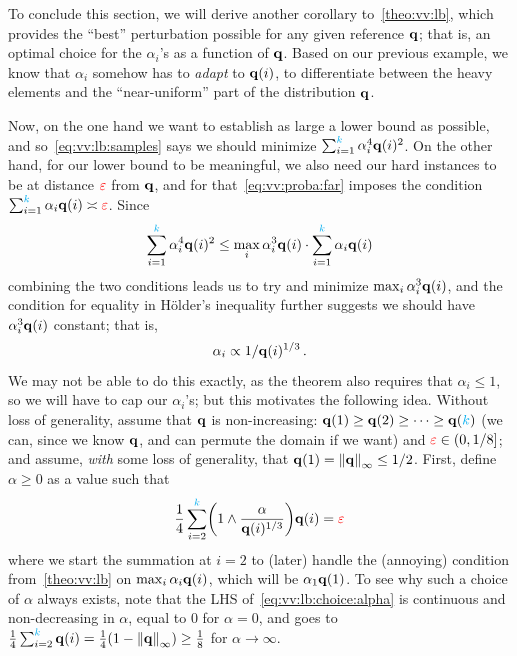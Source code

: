 To conclude this section, we will derive another corollary to~\cref{theo:vv:lb}, which provides the ``best'' perturbation possible for any given reference $\mathbf{q}$; that is, an optimal choice for the $\alpha_i$'s as a function of $\mathbf{q}$. Based on our previous example, we know that $\alpha_i$ somehow has to \emph{adapt} to $\mathbf{q}(i)$, to differentiate between the heavy elements and the ``near-uniform'' part of the distribution $\mathbf{q}$.

Now, on the one hand we want to establish as large a lower bound as possible, and so~\cref{eq:vv:lb:samples} says we should minimize
$
\sum_{i=1}^{\textcolor{cyan}{k}} \alpha_i^4\mathbf{q}(i)^2
$. On the other hand, for our lower bound to be meaningful, we also need our hard instances to be at distance $\textcolor{red}{\varepsilon}$ from $\mathbf{q}$, and for that~\cref{eq:vv:proba:far} imposes the condition
$
\sum_{i=1}^{\textcolor{cyan}{k}} \alpha_i\mathbf{q}(i) \asymp \textcolor{red}{\varepsilon}
$. Since
\begin{equation}
	\sum_{i=1}^{\textcolor{cyan}{k}} \alpha_i^4\mathbf{q}(i)^2 \leq \max_i \alpha_i^3\mathbf{q}(i) \cdot \sum_{i=1}^{\textcolor{cyan}{k}} \alpha_i\mathbf{q}(i)
\end{equation}
combining the two conditions leads us to try and minimize $\max_i \alpha_i^3\mathbf{q}(i)$, and the condition for equality in H\"older's inequality further suggests we should have $\alpha_i^3\mathbf{q}(i)$ constant; that is,
\begin{equation}
	\label{eq:vv:lb:intuition}
	\alpha_i \propto 1/\mathbf{q}(i)^{1/3}\,.
\end{equation}
We may not be able to do this exactly, as the theorem also requires that $\alpha_i \leq 1$, so we will have to cap our $\alpha_i$'s;  but this motivates the following idea. Without loss of generality, assume that $\mathbf{q}$ is non-increasing: $\mathbf{q}(1)\geq \mathbf{q}(2)\geq \dots\geq \mathbf{q}({\textcolor{cyan}{k}})$ (we can, since we know $\mathbf{q}$, and can permute the domain if we want) and $\textcolor{red}{\varepsilon}\in(0,1/8]$; and assume, \emph{with} some loss of generality, that $\q(1)=\norminf{\q} \leq 1/2$. First, define $\alpha\geq 0$ as a value such that
\begin{equation}
	\label{eq:vv:lb:choice:alpha}
	\frac{1}{4}\sum_{i=2}^\ab \Paren{1\land \frac{\alpha}{\q(i)^{1/3}}}\q(i) = \dst
\end{equation}
where we start the summation at $i=2$ to (later) handle the (annoying) condition from~\cref{theo:vv:lb} on $\max_i \alpha_i\mathbf{q}(i)$, which will be $\alpha_1\mathbf{q}(1)$. To see why such a choice of $\alpha$ always exists, note that 
the LHS of~\cref{eq:vv:lb:choice:alpha} is continuous and non-decreasing in $\alpha$, equal to $0$ for $\alpha=0$, and goes to $\frac{1}{4}\sum_{i=2}^\ab \q(i) = \frac{1}{4}(1-\norminf{\q}) \geq \frac{1}{8}$ for $\alpha\to\infty$.

